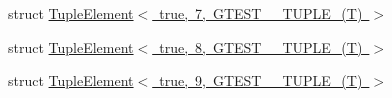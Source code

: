 \begin{DoxyCompactItemize}
\item 
struct \mbox{\hyperlink{structstd_1_1tr1_1_1gtest__internal_1_1_tuple_element_3_01true_00_017_00_01_g_t_e_s_t__10___t_u_p_l_e___07_t_08_01_4}{Tuple\+Element$<$ true, 7, G\+T\+E\+S\+T\+\_\+\_\+\+T\+U\+P\+L\+E\+\_\+(\+T) $>$}}
\item 
struct \mbox{\hyperlink{structstd_1_1tr1_1_1gtest__internal_1_1_tuple_element_3_01true_00_018_00_01_g_t_e_s_t__10___t_u_p_l_e___07_t_08_01_4}{Tuple\+Element$<$ true, 8, G\+T\+E\+S\+T\+\_\+\_\+\+T\+U\+P\+L\+E\+\_\+(\+T) $>$}}
\item 
struct \mbox{\hyperlink{structstd_1_1tr1_1_1gtest__internal_1_1_tuple_element_3_01true_00_019_00_01_g_t_e_s_t__10___t_u_p_l_e___07_t_08_01_4}{Tuple\+Element$<$ true, 9, G\+T\+E\+S\+T\+\_\+\_\+\+T\+U\+P\+L\+E\+\_\+(\+T) $>$}}
\end{DoxyCompactItemize}
